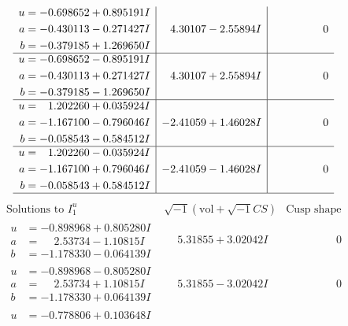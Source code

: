 \documentclass[1p]{elsarticle_modified}
\theoremstyle{definition}
\newcommand{\I}{\sqrt{-1}}
\begin{document}
$$\begin{array}{c|c|c}
\begin{aligned}
u &= -0.698652 + 0.895191 I \\
a &= -0.430113 - 0.271427 I \\
b &= -0.379185 + 1.269650 I\end{aligned}
 & \phantom{-}4.30107 - 2.55894 I & \phantom{-0.000000 } 0 \\ \hline\begin{aligned}
u &= -0.698652 - 0.895191 I \\
a &= -0.430113 + 0.271427 I \\
b &= -0.379185 - 1.269650 I\end{aligned}
 & \phantom{-}4.30107 + 2.55894 I & \phantom{-0.000000 } 0 \\ \hline\begin{aligned}
u &= \phantom{-}1.202260 + 0.035924 I \\
a &= -1.167100 - 0.796046 I \\
b &= -0.058543 - 0.584512 I\end{aligned}
 & -2.41059 + 1.46028 I & \phantom{-0.000000 } 0 \\ \hline\begin{aligned}
u &= \phantom{-}1.202260 - 0.035924 I \\
a &= -1.167100 + 0.796046 I \\
b &= -0.058543 + 0.584512 I\end{aligned}
 & -2.41059 - 1.46028 I & \phantom{-0.000000 } 0\\
 \hline 
 \end{array}$$\newpage$$\begin{array}{c|c|c}  
\text{Solutions to }I^u_{1}& \I (\text{vol} + \sqrt{-1}CS) & \text{Cusp shape}\\
 \hline 
\begin{aligned}
u &= -0.898968 + 0.805280 I \\
a &= \phantom{-}2.53734 - 1.10815 I \\
b &= -1.178330 - 0.064139 I\end{aligned}
 & \phantom{-}5.31855 + 3.02042 I & \phantom{-0.000000 } 0 \\ \hline\begin{aligned}
u &= -0.898968 - 0.805280 I \\
a &= \phantom{-}2.53734 + 1.10815 I \\
b &= -1.178330 + 0.064139 I\end{aligned}
 & \phantom{-}5.31855 - 3.02042 I & \phantom{-0.000000 } 0 \\ \hline\begin{aligned}
u &= -0.778806 + 0.103648 I \\

\end{aligned}
\end{array}$$
\end{document}

